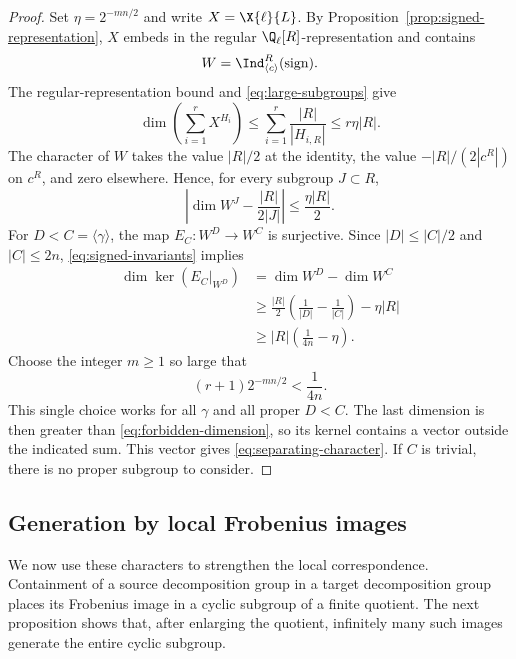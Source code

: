 \begin{proof}
Set $\eta=2^{-mn/2}$ and write $X=\X{\ell}{L}$. By
Proposition~\ref{prop:signed-representation}, $X$ embeds in the regular
$\Q_\ell[R]$-representation and contains
\[
 W=\Ind_{\langle c\rangle}^{R}(\operatorname{sign}).
\]
The regular-representation bound and \eqref{eq:large-subgroups} give
\begin{equation}\label{eq:forbidden-dimension}
 \dim\left(\sum_{i=1}^rX^{H_i}\right)
 \leq\sum_{i=1}^r\frac{|R|}{|H_{i,R}|}
 \leq r\eta|R|.
\end{equation}
The character of $W$ takes the value $|R|/2$ at the identity,
the value $-|R|/(2|c^R|)$ on $c^R$, and zero elsewhere.
Hence, for every subgroup $J\subset R$,
\begin{equation}\label{eq:signed-invariants}
 \left|\dim W^J-\frac{|R|}{2|J|}\right|
 \leq\frac{\eta|R|}{2}.
\end{equation}
For $D<C=\langle\gamma\rangle$, the map
$E_C:W^D\to W^C$ is surjective. Since $|D|\leq |C|/2$ and
$|C|\leq2n$, \eqref{eq:signed-invariants} implies
\begin{align*}
 \dim\ker(E_C|_{W^D})
 &=\dim W^D-\dim W^C\\
 &\geq\frac{|R|}{2}\left(\frac1{|D|}-\frac1{|C|}\right)
       -\eta|R|\\
 &\geq |R|\left(\frac1{4n}-\eta\right).
\end{align*}
Choose the integer $m\geq1$ so large that
\[
  (r+1)2^{-mn/2}<\frac1{4n}.
\]
This single choice works for all $\gamma$ and all proper $D<C$.
The last dimension is then greater than
\eqref{eq:forbidden-dimension}, so its kernel contains a vector
outside the indicated sum. This vector gives
\eqref{eq:separating-character}. If $C$ is trivial, there is no
proper subgroup to consider.
\end{proof}

\subsection{Generation by local Frobenius images}

We now use these characters to strengthen the local correspondence.
Containment of a source decomposition group in a target decomposition
group places its Frobenius image in a cyclic subgroup of a finite
quotient. The next proposition shows that, after enlarging the
quotient, infinitely many such images generate the entire cyclic
subgroup.

